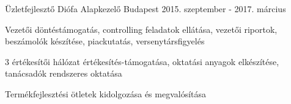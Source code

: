 \begin{cventries}
  \cventry
    {Üzletfejlesztő} %
    {Diófa Alapkezelő} %
    {Budapest} %
    {2015. szeptember - 2017. március} %
    {
      \begin{cvitems} %
        \item {Vezetői döntéstámogatás, controlling feladatok ellátása, vezetői riportok, beszámolók készítése, piackutatás, versenytársfigyelés}
        \item {3 értékesítői hálózat értékesítés-támogatása, oktatási anyagok elkészítése, tanácsadók rendszeres oktatása}
        \item {Termékfejlesztési ötletek kidolgozása és megvalósítása}
      \end{cvitems}
    }

\end{cventries}
